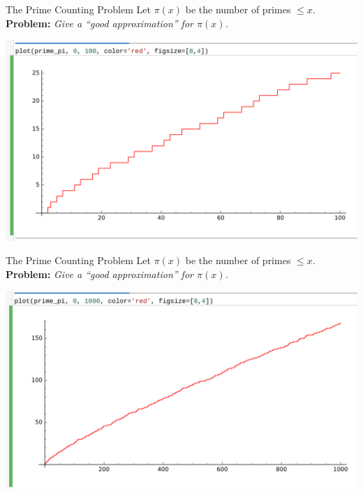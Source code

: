 \documentclass{beamer}
\begin{document}
\begin{frame}{The Prime Counting Problem}
  Let $\pi(x)$ be the number of primes $\leq x$.\\
  {\bf Problem:} {\em Give a ``good approximation'' for $\pi(x)$.}
  \vfill

  \includegraphics[width=.98\textwidth]{pics/prime-pi-100}

\end{frame}

\begin{frame}{The Prime Counting Problem}
  Let $\pi(x)$ be the number of primes $\leq x$.\\
  {\bf Problem:} {\em Give a ``good approximation'' for $\pi(x)$.}
  \vfill

  \includegraphics[width=.98\textwidth]{pics/prime-pi-1000}

\end{frame}
\end{document}
